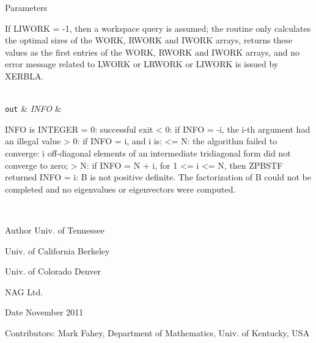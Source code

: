 \begin{DoxyParams}[1]{Parameters}
\begin{DoxyVerb}
          If LIWORK = -1, then a workspace query is assumed; the
          routine only calculates the optimal sizes of the WORK, RWORK
          and IWORK arrays, returns these values as the first entries
          of the WORK, RWORK and IWORK arrays, and no error message
          related to LWORK or LRWORK or LIWORK is issued by XERBLA.\end{DoxyVerb}
\\
\hline
\mbox{\tt out}  & {\em I\+N\+F\+O} & \begin{DoxyVerb}          INFO is INTEGER
          = 0:  successful exit
          < 0:  if INFO = -i, the i-th argument had an illegal value
          > 0:  if INFO = i, and i is:
             <= N:  the algorithm failed to converge:
                    i off-diagonal elements of an intermediate
                    tridiagonal form did not converge to zero;
             > N:   if INFO = N + i, for 1 <= i <= N, then ZPBSTF
                    returned INFO = i: B is not positive definite.
                    The factorization of B could not be completed and
                    no eigenvalues or eigenvectors were computed.\end{DoxyVerb}
 \\
\hline
\end{DoxyParams}
\begin{DoxyAuthor}{Author}
Univ. of Tennessee 

Univ. of California Berkeley 

Univ. of Colorado Denver 

N\+A\+G Ltd. 
\end{DoxyAuthor}
\begin{DoxyDate}{Date}
November 2011 
\end{DoxyDate}
\begin{DoxyParagraph}{Contributors\+: }
Mark Fahey, Department of Mathematics, Univ. of Kentucky, U\+S\+A 
\end{DoxyParagraph}
